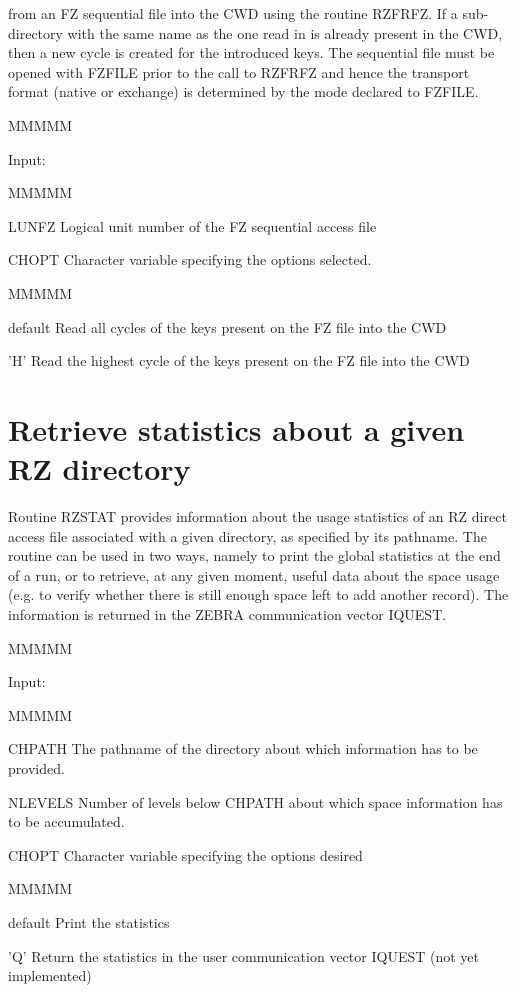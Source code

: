 from an FZ sequential file
into the CWD using the routine RZFRFZ.
If a sub-directory with the same name as the one read in is already
present in the CWD, then a new cycle is created for the introduced keys.
The sequential file must be opened with FZFILE prior to the call to RZFRFZ
and hence the transport format (native or exchange)
is determined by the mode declared to FZFILE.
\begin{DL}{MMMMM}
\item[Input:
]
\begin{DL}{MMMMM}
\item[LUNFZ
]Logical unit number of the FZ sequential access file
\item[CHOPT
]Character variable specifying the options selected.
\begin{DL}{MMMMM}
\item[default
]Read all cycles of the keys present on the FZ file into the CWD
\item['H'
]Read the highest cycle of the keys present on the FZ file into
the CWD
\end{DL}
\end{DL}
\end{DL}
\section{Retrieve statistics about a given RZ directory}
\par Routine RZSTAT provides information about the usage statistics
of an RZ direct access file associated with a given directory,
as specified by its pathname.
The routine can be used in two ways,
namely to print the global statistics at the end of a run, or
to retrieve, at any given moment, useful data about the space usage
(e.g. to verify whether there is
still enough space left to add another record).
The information is returned in the ZEBRA communication vector IQUEST.
\begin{DL}{MMMMM}
\item[Input:
]
\begin{DL}{MMMMM}
\item[CHPATH
]The pathname of the directory about which information
has to be provided.
\item[NLEVELS
]Number of levels below CHPATH about which space information has
to be accumulated.
\item[CHOPT
]Character variable specifying the options desired
\begin{DL}{MMMMM}
\item[default
]Print the statistics
\item['Q'
]Return the statistics in the user communication vector IQUEST
\newline (not yet implemented)
\end{DL}
\end{DL}
\end{DL}
